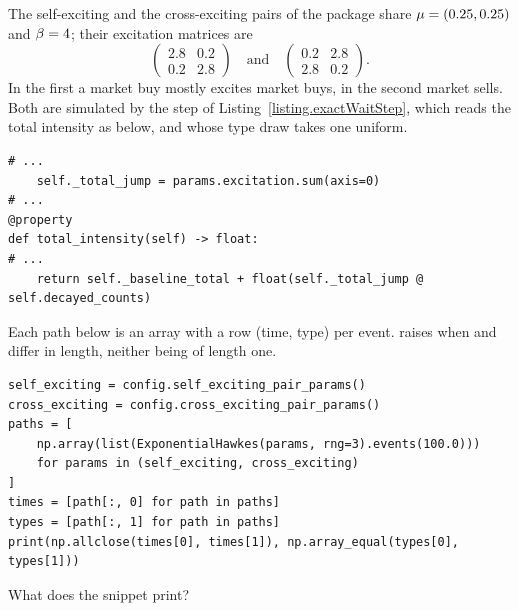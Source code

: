 \begin{question}
\label{question.selfAndCrossExcitingShareTheirTimes}
The self-exciting and the cross-exciting pairs of the package share
$\mu = (0.25, 0.25)$ and $\beta = 4$;
their excitation matrices are
\begin{equation*}
 \begin{pmatrix} 2.8 & 0.2 \\ 0.2 & 2.8 \end{pmatrix}
 \quad\text{and}\quad
 \begin{pmatrix} 0.2 & 2.8 \\ 2.8 & 0.2 \end{pmatrix}.
\end{equation*}
In the first a market buy mostly excites market buys,
in the second market sells.
Both are simulated by the step of Listing~\ref{listing.exactWaitStep},
which reads the total intensity as below,
and whose type draw takes one uniform.
\begin{lstlisting}[caption={\protect\codehl{unito26.lob.hawkes.\_HawkesState}: the total intensity.}, label=listing.selfAndCrossTotalIntensity]
# ...
    self._total_jump = params.excitation.sum(axis=0)
# ...
@property
def total_intensity(self) -> float:
# ...
    return self._baseline_total + float(self._total_jump @ self.decayed_counts)
\end{lstlisting}
Each path below is an array with a row (time, type) per event.
 raises  when  and 
differ in length, neither being of length one.
\begin{lstlisting}[caption={The two pairs on one seed}, label=listing.selfAndCrossExcitingShareTheirTimesRun]
self_exciting = config.self_exciting_pair_params()
cross_exciting = config.cross_exciting_pair_params()
paths = [
    np.array(list(ExponentialHawkes(params, rng=3).events(100.0)))
    for params in (self_exciting, cross_exciting)
]
times = [path[:, 0] for path in paths]
types = [path[:, 1] for path in paths]
print(np.allclose(times[0], times[1]), np.array_equal(types[0], types[1]))
\end{lstlisting}
What does the snippet print?
\begin{choices}
 \choice {}
 \choice {}
 \correctchoice {}
 \choice {}
\end{choices}
\end{question}

